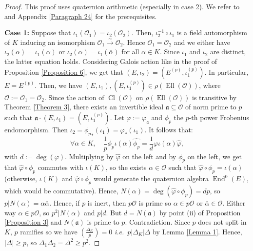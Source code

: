 \documentclass[a4paper,10pt,notitlepage]{report}
\theoremstyle{definition}
\theoremstyle{plain}
\theoremstyle{definition}
\newcommand{\ie}{\emph{i.e.}\ }
\newcommand{\mO}{\mathcal{O}}
\renewcommand{\(}{\left(}
\renewcommand{\)}{\right)}
\newcommand{\mf}[1]{\mathfrak{#1}}
\DeclareMathOperator{\End}{End}
\DeclareMathOperator{\Cl}{Cl}
\DeclareMathOperator{\Ell}{Ell}
\begin{document}
\begin{proof}
This proof uses quaternion arithmetic (especially in case 2). We refer to \cite{Voight} and Appendix \ref{Paragraph 24} for the prerequisites.

\textbf{Case 1:} Suppose that $\iota_1(\mO_1)=\iota_2(\mO_2)$. Then, $\iota_2^{-1}\circ\iota_1$ is a field automorphism of $K$ inducing an isomorphism $\mO_1\overset{\sim}{\longrightarrow}\mO_2$. Hence $\mO_1=\mO_2$ and we either have $\iota_2(\alpha)=\iota_1(\alpha)$ or $\iota_2(\alpha)=\iota_1(\overline{\alpha})$ for all $\alpha\in K$.  Since $\iota_1$ and $\iota_2$ are distinct, the latter equation holds. Considering Galois action like in the proof of Proposition \ref{Proposition 6}, we get that $(E,\iota_2)=(E^{(p)},\iota_1^{(p)})$. In particular, $E=E^{(p)}$. Then, we have $(E,\iota_1),(E,\iota_1^{(p)})\in\rho(\Ell(\mO))$, where $\mO:=\mO_1=\mO_2$. Since the action of $\Cl(\mO)$ on $\rho(\Ell(\mO))$ is transitive by Theorem \ref{Theorem 3}, there exists an invertible ideal $\mf{a}\subseteq\mO$ of norm prime to $p$ such that $\mf{a}\cdot(E,\iota_1)=(E,\iota_1^{(p)})$.  Let $\varphi:=\varphi_{\mf{a}}$ and $\phi_p$ the $p$-th power Frobenius endomorphism. Then $\iota_2={\phi_p}_*(\iota_1)=\varphi_*(\iota_1)$. It follows that:
\[\forall\alpha\in K, \quad \frac{1}{p}\phi_p\iota(\alpha)\widehat{\phi_p}=\frac{1}{d}\varphi\iota(\alpha)\widehat{\varphi},\]
with $d:=\deg(\varphi)$. Multiplying by $\widehat{\varphi}$ on the left and by $\phi_p$ on the left, we get that $\widehat{\varphi}\circ\phi_p$ commutes with $\iota(K)$, so the exists $\alpha\in\mO$ such that $\widehat{\varphi}\circ\phi_p=\iota(\alpha)$ (otherwise, $\iota(K)$ and $\widehat{\varphi}\circ\phi_p$ would generate the quaternion algebra $\End^0(E)$, which would be commutative). Hence, $N(\alpha)=\deg(\widehat{\varphi}\circ\phi_p)=dp$, so $p|N(\alpha)=\alpha\overline{\alpha}$. Hence, if $p$ is inert, then $p\mO$ is prime so $\alpha\in p\mO$ or $\overline{\alpha}\in\mO$. Either way $\alpha\in p\mO$, so $p^2|N(\alpha)$ and $p|d$. But $d=N(\mf{a})$ by point (ii) of Proposition \ref{Proposition 3} and $N(\mf{a})$ is prime to $p$. Contradiction. Since $p$ does not split in $K$, $p$ ramifies so we have $\(\frac{\Delta_K}{p}\)=0$ \ie $p|\Delta_K|\Delta$ by Lemma \ref{Lemma 1}.  Hence, $|\Delta|\geq p$, so $\Delta_1\Delta_2=\Delta^2\geq p^2$.


\end{proof}
\end{document}
